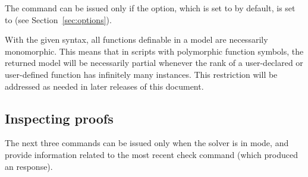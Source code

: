 \begin{description}
The command can be issued only if the  option,
which is set to  by default, is set to  
(see Section~\ref{sec:options}).

\begin{remark}
With the given syntax, all functions definable in a model are necessarily monomorphic.
This means that in scripts with polymorphic function symbols, 
the returned model will be necessarily partial 
whenever the rank of a user-declared or user-defined function has infinitely many instances.
This restriction will be addressed as needed in later releases of this document.
\end{remark}

\end{description}

\subsection{Inspecting proofs} 

The next three commands can be issued only when the solver is 
in  mode, and provide information related to the most recent 
check command (which produced an  response).

